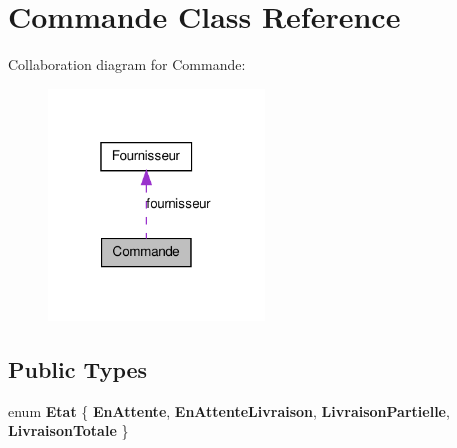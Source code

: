 \hypertarget{class_commande}{
\section{Commande Class Reference}
\label{da/de7/class_commande}
}


Collaboration diagram for Commande:\nopagebreak
\begin{figure}[H]
\begin{center}
\leavevmode
\includegraphics[width=163pt]{de/d29/class_commande__coll__graph}
\end{center}
\end{figure}
\subsection*{Public Types}
\begin{DoxyCompactItemize}
\item 
enum {\bfseries Etat} \{ {\bfseries EnAttente}, 
{\bfseries EnAttenteLivraison}, 
{\bfseries LivraisonPartielle}, 
{\bfseries LivraisonTotale}
 \}
\end{DoxyCompactItemize}
